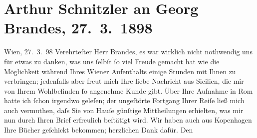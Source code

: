 

               \section[Arthur Schnitzler an Georg Brandes, 27. 3. 1898]{ Arthur Schnitzler an Georg Brandes, 27. 3. 1898}\nopagebreak{}\rehead{ }\begin{ledgroupsized}[t]{13cm}\normalsize\beginnumbering{} \toendnotes[C]{\smallbreak\pagebreak[2]} 
\toendnotes[C]{\smallbreak}\pstart
           \raggedleft{}{\pb}Wien, 27. 3. 98\pend
           \pstart{}Verehrteſter Herr Brandes,\pend\pstart
           es war wirklich nicht nothwendig uns für etwas zu danken, was uns ſelbſt ſo viel
               Freude gemacht hat wie die Möglichkeit während Ihres Wiener Aufenthalts einige Stunden mit Ihnen zu verbringen; jedenfalls aber
               freut mich Ihre liebe Nachricht aus Sicilien, die
               mir von Ihrem Wohlbefinden ſo ange{\pb}nehme Kunde
               gibt. Über Ihre Aufnahme in Rom hatte ich ſchon
               irgendwo geleſen; der ungeſtörte Fortgang Ihrer Reiſe ließ mich auch vermuthen, daſs
               Sie von Hauſe günſtige Mittheilungen erhielten, was mir nun durch Ihren Brief
               erfreulich beſtätigt wird. Wir haben auch aus Kopenhagen Ihre Bücher geſchickt bekommen; herzlichen Dank dafür. Den

\end{ledgroupsized}
